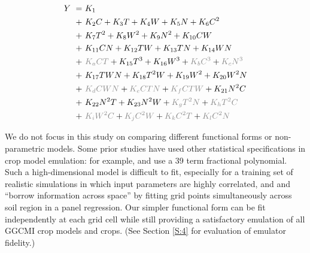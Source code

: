 \documentclass[gmd, manuscript]{copernicus} %
\begin{document}
\begin{align}
    \label{eqn:features_original}
    Y\ = \ & K_{1}  \\
    + \ & K_{2} C     + K_{3} T      + K_{4} W      + K_{5} N  + K_{6} C^2 \nonumber \\
    + \ & K_{7} T^2    + K_{8} W^2    + K_{9} N^2 + K_{10} C W \nonumber \\
    + \ & K_{11} C N   + K_{12} T W   + K_{13} T N + K_{14} W N \nonumber \\
    + \ & {\color{dark-gray}K_{a} C T} + K_{15} T^3  + K_{16} W^3  + {\color{dark-gray}K_{b} C^3} + {\color{dark-gray}K_{c} N^3}\nonumber \\
    + \ & K_{17} T W N + K_{18} T^2 W + K_{19} W^2 + K_{20} W^2 N  \nonumber \\
    + \ & {\color{dark-gray}K_{d} C W N} + {\color{dark-gray}K_{e} C T N} + {\color{dark-gray}K_{f} C T W} + K_{21} N^2 C \nonumber \\
    + \ & K_{22} N^2 T + K_{23} N^2 W + {\color{dark-gray}K_{g} T^2 N} + {\color{dark-gray}K_{h} T^2 C}  \nonumber \\
    + \ & {\color{dark-gray}K_{i} W^2 C} + {\color{dark-gray}K_{j} C^2 W} + {\color{dark-gray}K_{k} C^2 T} + {\color{dark-gray}K_{l} C^2 N} \nonumber
\end{align}

We do not focus in this study on comparing different functional forms or non-parametric models.
Some prior studies have used other statistical specifications in crop model emulation: for example, \citet{BLANC2015} and \citet{BLANC2017} use a 39 term fractional polynomial. 
Such a high-dimensional model is difficult to fit, especially for a training set of realistic simulations in which input parameters are highly correlated, and  \citet{BLANC2015} and \citet{BLANC2017}  ``borrow information across space'' by fitting grid points simultaneously across soil region in a panel regression. 
Our simpler functional form can be fit independently at each grid cell while still providing a satisfactory emulation of all GGCMI crop models and crops. 
(See Section \ref{S:4} for evaluation of emulator fidelity.)
\end{document}
